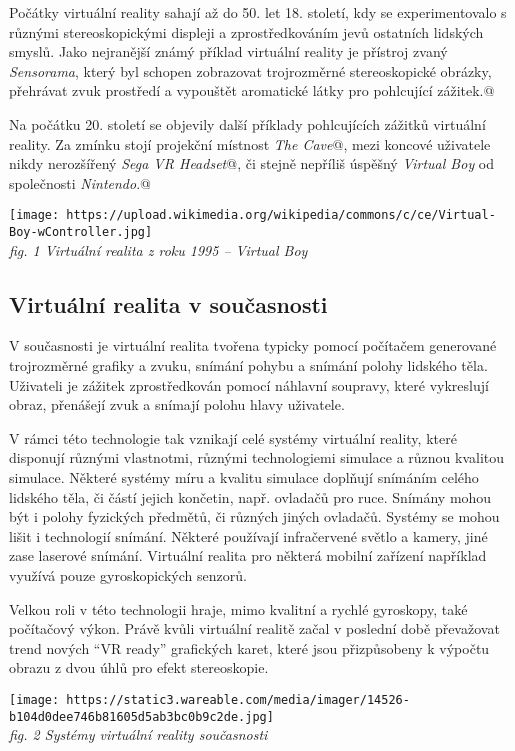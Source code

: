 Počátky virtuální reality sahají až do 50. let 18. století, kdy se
experimentovalo s různými stereoskopickými displeji a zprostředkováním
jevů ostatních lidských smyslů. Jako nejranější známý příklad virtuální
reality je přístroj zvaný \emph{Sensorama}, který byl schopen zobrazovat
trojrozměrné stereoskopické obrázky, přehrávat zvuk prostředí a
vypouštět aromatické látky pro pohlcující zážitek.@

Na počátku 20. století se objevily další příklady pohlcujících zážitků
virtuální reality. Za zmínku stojí projekční místnost \emph{The Cave}@,
mezi koncové uživatele nikdy nerozšířený \emph{Sega VR Headset}@, či
stejně nepříliš úspěšný \emph{Virtual Boy} od společnosti
\emph{Nintendo}.@

\texttt{[image: https://upload.wikimedia.org/wikipedia/commons/c/ce/Virtual-Boy-wController.jpg]}\\
\emph{fig. 1 Virtuální realita z roku 1995 -- Virtual Boy}

\subsection{Virtuální realita v
současnosti}\label{virtuuxe1lnuxed-realita-v-souux10dasnosti}

V současnosti je virtuální realita tvořena typicky pomocí počítačem
generované trojrozměrné grafiky a zvuku, snímání pohybu a snímání polohy
lidského těla. Uživateli je zážitek zprostředkován pomocí náhlavní
soupravy, které vykreslují obraz, přenášejí zvuk a snímají polohu hlavy
uživatele.

V rámci této technologie tak vznikají celé systémy virtuální reality,
které disponují různými vlastnotmi, různými technologiemi simulace a
různou kvalitou simulace. Některé systémy míru a kvalitu simulace
doplňují snímáním celého lidského těla, či částí jejich končetin, např.
ovladačů pro ruce. Snímány mohou být i polohy fyzických předmětů, či
různých jiných ovladačů. Systémy se mohou lišit i technologií snímání.
Některé používají infračervené světlo a kamery, jiné zase laserové
snímání. Virtuální realita pro některá mobilní zařízení například
využívá pouze gyroskopických senzorů.

Velkou roli v této technologii hraje, mimo kvalitní a rychlé gyroskopy,
také počítačový výkon. Právě kvůli virtuální realitě začal v poslední
době převažovat trend nových ``VR ready'' grafických karet, které jsou
přizpůsobeny k výpočtu obrazu z dvou úhlů pro efekt stereoskopie.

\texttt{[image: https://static3.wareable.com/media/imager/14526-b104d0dee746b81605d5ab3bc0b9c2de.jpg]}\\
\emph{fig. 2 Systémy virtuální reality současnosti}

